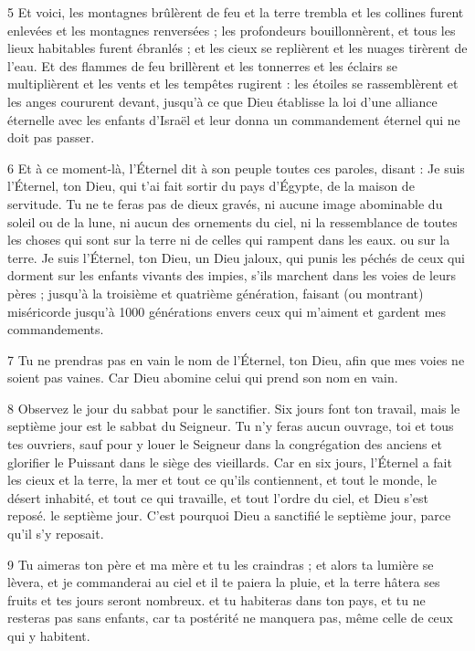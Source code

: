 \par 5 Et voici, les montagnes brûlèrent de feu et la terre trembla et les collines furent enlevées et les montagnes renversées ; les profondeurs bouillonnèrent, et tous les lieux habitables furent ébranlés ; et les cieux se replièrent et les nuages ​​tirèrent de l'eau. Et des flammes de feu brillèrent et les tonnerres et les éclairs se multiplièrent et les vents et les tempêtes rugirent : les étoiles se rassemblèrent et les anges coururent devant, jusqu'à ce que Dieu établisse la loi d'une alliance éternelle avec les enfants d'Israël et leur donna un commandement éternel qui ne doit pas passer.

\par 6 Et à ce moment-là, l'Éternel dit à son peuple toutes ces paroles, disant : Je suis l'Éternel, ton Dieu, qui t'ai fait sortir du pays d'Égypte, de la maison de servitude. Tu ne te feras pas de dieux gravés, ni aucune image abominable du soleil ou de la lune, ni aucun des ornements du ciel, ni la ressemblance de toutes les choses qui sont sur la terre ni de celles qui rampent dans les eaux. ou sur la terre. Je suis l'Éternel, ton Dieu, un Dieu jaloux, qui punis les péchés de ceux qui dorment sur les enfants vivants des impies, s'ils marchent dans les voies de leurs pères ; jusqu'à la troisième et quatrième génération, faisant (ou montrant) miséricorde jusqu'à 1000 générations envers ceux qui m'aiment et gardent mes commandements.

\par 7 Tu ne prendras pas en vain le nom de l'Éternel, ton Dieu, afin que mes voies ne soient pas vaines. Car Dieu abomine celui qui prend son nom en vain.

\par 8 Observez le jour du sabbat pour le sanctifier. Six jours font ton travail, mais le septième jour est le sabbat du Seigneur. Tu n'y feras aucun ouvrage, toi et tous tes ouvriers, sauf pour y louer le Seigneur dans la congrégation des anciens et glorifier le Puissant dans le siège des vieillards. Car en six jours, l'Éternel a fait les cieux et la terre, la mer et tout ce qu'ils contiennent, et tout le monde, le désert inhabité, et tout ce qui travaille, et tout l'ordre du ciel, et Dieu s'est reposé. le septième jour. C'est pourquoi Dieu a sanctifié le septième jour, parce qu'il s'y reposait.

\par 9 Tu aimeras ton père et ma mère et tu les craindras ; et alors ta lumière se lèvera, et je commanderai au ciel et il te paiera la pluie, et la terre hâtera ses fruits et tes jours seront nombreux. et tu habiteras dans ton pays, et tu ne resteras pas sans enfants, car ta postérité ne manquera pas, même celle de ceux qui y habitent.

